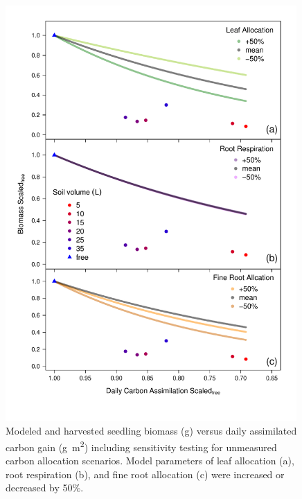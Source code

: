 \documentclass[a4paper]{article}\usepackage[]{graphicx}\usepackage[]{color}
\begin{document}
\begin{figure}[h!]
    \centering
    \includegraphics[width=0.99\textwidth]{gc_Day_scenario.pdf}
    \caption{Modeled and harvested seedling biomass (g) versus daily assimilated carbon gain (g~m\textsuperscript{2}) including sensitivity testing for unmeasured carbon allocation scenarios.  Model parameters of leaf allocation (a), root respiration (b), and fine root allocation (c) were increased or decreased by 50$\%$.}
    \label{fig:figureSI1}
\end{figure}

\clearpage


\end{document}
